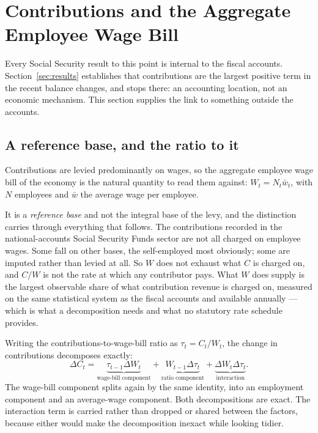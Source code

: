 
\section{Contributions and the Aggregate Employee Wage Bill}
\label{sec:contributionbase}

Every Social Security result to this point is internal to the fiscal accounts.
Section~\ref{sec:results} establishes that contributions are the largest positive term
in the recent balance changes, and stops there: an accounting location, not an economic
mechanism. This section supplies the link to something outside the accounts.

\subsection{A reference base, and the ratio to it}

Contributions are levied predominantly on wages, so the aggregate employee wage bill of
the economy is the natural quantity to read them against: $W_t = N_t \bar{w}_t$, with $N$
employees and $\bar{w}$ the average wage per employee.

It is a \emph{reference base} and not the integral base of the levy, and the distinction
carries through everything that follows. The contributions recorded in the
national-accounts Social Security Funds sector are not all charged on employee wages.
Some fall on other bases, the self-employed most obviously; some are imputed rather than
levied at all. So $W$ does not exhaust what $C$ is charged on, and $C/W$ is not the rate
at which any contributor pays. What $W$ does supply is the largest observable share of
what contribution revenue is charged on, measured on the same statistical system as the
fiscal accounts and available annually --- which is what a decomposition needs and what
no statutory rate schedule provides.

Writing the contributions-to-wage-bill ratio as $\tau_t = C_t / W_t$, the change in
contributions decomposes exactly:
\begin{equation}
\Delta C_t = \underbrace{\tau_{t-1} \Delta W_t}_{\text{wage-bill component}}
+ \underbrace{W_{t-1} \Delta \tau_t}_{\text{ratio component}}
+ \underbrace{\Delta W_t \Delta \tau_t}_{\text{interaction}}.
\label{eq:contributionbase}
\end{equation}
The wage-bill component splits again by the same identity, into an employment component
and an average-wage component. Both decompositions are exact. The interaction term is
carried rather than dropped or shared between the factors, because either would make the
decomposition inexact while looking tidier.

